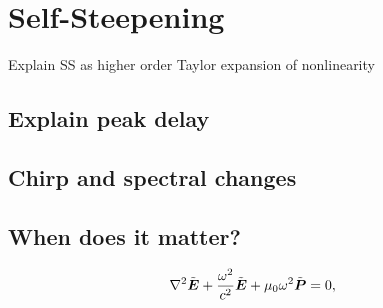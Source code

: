 \chapter{Self-Steepening}
\label{ch:SS}

Explain SS as higher order Taylor expansion of nonlinearity

\section{Explain peak delay}

\section{Chirp and spectral changes}

\section{When does it matter?}

 
\begin{align}
    \nabla^{2}\tilde{\boldsymbol{E}}+\frac{\omega^{2}}{c^{2}}\tilde{\boldsymbol{E}}+\text{\ensuremath{\mu_{0}}}\omega^{2}\tilde{\boldsymbol{P}}&=0,
\end{align}